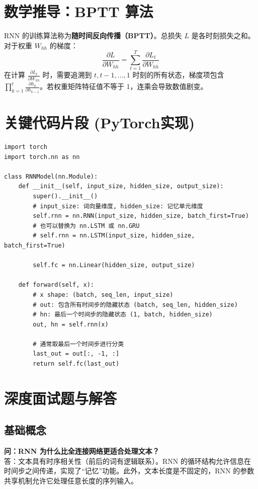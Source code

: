 \documentclass[12pt, a4paper]{book}
\begin{document}
\section{数学推导：BPTT 算法}
RNN 的训练算法称为\textbf{随时间反向传播（BPTT）}。总损失 $L$ 是各时刻损失之和。对于权重 $W_{hh}$ 的梯度：
$$ \frac{\partial L}{\partial W_{hh}} = \sum_{t=1}^T \frac{\partial L_t}{\partial W_{hh}} $$
在计算 $\frac{\partial L_t}{\partial W_{hh}}$ 时，需要追溯到 $t, t-1, \dots, 1$ 时刻的所有状态，梯度项包含 $\prod_{k=1}^t \frac{\partial h_k}{\partial h_{k-1}}$。若权重矩阵特征值不等于 1，连乘会导致数值剧变。

\section{关键代码片段 (PyTorch实现)}
\begin{lstlisting}
import torch
import torch.nn as nn

class RNNModel(nn.Module):
    def __init__(self, input_size, hidden_size, output_size):
        super().__init__()
        # input_size: 词向量维度, hidden_size: 记忆单元维度
        self.rnn = nn.RNN(input_size, hidden_size, batch_first=True)
        # 也可以替换为 nn.LSTM 或 nn.GRU
        # self.rnn = nn.LSTM(input_size, hidden_size, batch_first=True)
        
        self.fc = nn.Linear(hidden_size, output_size)

    def forward(self, x):
        # x shape: (batch, seq_len, input_size)
        # out: 包含所有时间步的隐藏状态 (batch, seq_len, hidden_size)
        # hn: 最后一个时间步的隐藏状态 (1, batch, hidden_size)
        out, hn = self.rnn(x)
        
        # 通常取最后一个时间步进行分类
        last_out = out[:, -1, :]
        return self.fc(last_out)
\end{lstlisting}

\section{深度面试题与解答}
\subsection{基础概念}
\textbf{问：RNN 为什么比全连接网络更适合处理文本？}\\
答：文本具有时序相关性（前后的词有逻辑联系）。RNN 的循环结构允许信息在时间步之间传递，实现了“记忆”功能。此外，文本长度是不固定的，RNN 的参数共享机制允许它处理任意长度的序列输入。
\end{document}
